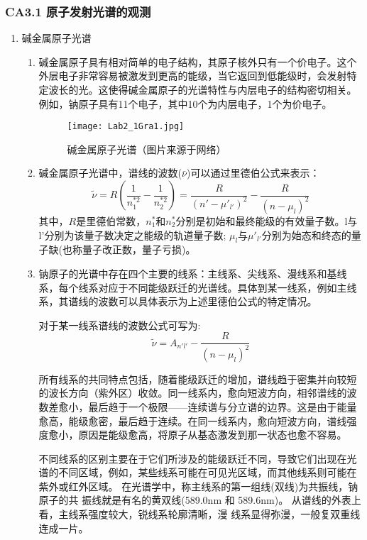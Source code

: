 \documentclass[dvipsnames, svgnames,a4paper,11pt]{article}
\begin{document}
	\subsubsection{CA3.1 原子发射光谱的观测}
	\begin{enumerate}
		\item 碱金属原子光谱
		\begin{enumerate}
			\item 碱金属原子具有相对简单的电子结构，其原子核外只有一个价电子。这个外层电子非常容易被激发到更高的能级，当它返回到低能级时，会发射特定波长的光。这使得碱金属原子的光谱特性与内层电子的结构密切相关。例如，钠原子具有11个电子，其中10个为内层电子，1个为价电子。
			
			\begin{figure}[htbp]
				\centering
				\texttt{[image: Lab2\_1Gra1.jpg]}
				\caption{碱金属原子光谱（图片来源于网络）}
				\label{fig:fig1}
			\end{figure}
			
			\item 碱金属原子光谱中，谱线的波数($\bar{\nu}$)可以通过里德伯公式来表示：
			\[
			\tilde{\nu} = R \left( \frac{1}{n_1^{*2}} - \frac{1}{n_2^{*2}} \right)=\dfrac{R}{(n'-\mu'_{l'})^2}-\dfrac{R}{(n-\mu_{l})^2}
			\]
			其中，$R$是里德伯常数，$n_1^*$和$n_2^*$分别是初始和最终能级的有效量子数。l与l'分别为该量子数决定之能级的轨道量子数;
			$\mu_{l}$与$\mu'_{l'}$分别为始态和终态的量子缺(也称量子改正数，量子亏损)。
			\item 钠原子的光谱中存在四个主要的线系：主线系、尖线系、漫线系和基线系，每个线系对应于不同能级跃迁的光谱线。具体到某一线系，例如主线系，其谱线的波数可以具体表示为上述里德伯公式的特定情况。
			
			对于某一线系谱线的波数公式可写为:
			\[\tilde{\nu} = A_{n'l'}-\dfrac{R}{(n-\mu_{l})^2}\]
			
			所有线系的共同特点包括，随着能级跃迁的增加，谱线趋于密集并向较短的波长方向（紫外区）收敛。同一线系内，愈向短波方向，相邻谱线的波数差愈小，最后趋于一个极限——连续谱与分立谱的边界。这是由于能量愈高，能级愈密，最后趋于连续。在同一线系内，愈向短波方向，谱线强度愈小，原因是能级愈高，将原子从基态激发到那一状态也愈不容易。
			
			不同线系的区别主要在于它们所涉及的能级跃迁不同，导致它们出现在光谱的不同区域，例如，某些线系可能在可见光区域，而其他线系则可能在紫外或红外区域。
			在光谱学中，称主线系的第一组线(双线)为共振线，钠原子的共 振线就是有名的黄双线(589.0nm 和 589.6nm)。
			从谱线的外表上看，主线系强度较大，锐线系轮廓清晰，漫 线系显得弥漫，一般复双重线连成一片。
		\end{enumerate}
		

\end{enumerate}
\end{document}
